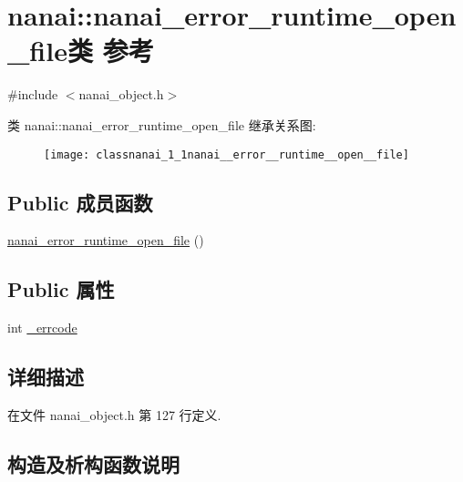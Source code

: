 \hypertarget{classnanai_1_1nanai__error__runtime__open__file}{}\section{nanai\+:\+:nanai\+\_\+error\+\_\+runtime\+\_\+open\+\_\+file类 参考}
\label{classnanai_1_1nanai__error__runtime__open__file}


{\ttfamily \#include $<$nanai\+\_\+object.\+h$>$}

类 nanai\+:\+:nanai\+\_\+error\+\_\+runtime\+\_\+open\+\_\+file 继承关系图\+:\begin{figure}[H]
\begin{center}
\leavevmode
\texttt{[image: classnanai\_1\_1nanai\_\_error\_\_runtime\_\_open\_\_file]}
\end{center}
\end{figure}
\subsection*{Public 成员函数}
\begin{DoxyCompactItemize}
\item 
\hyperlink{classnanai_1_1nanai__error__runtime__open__file_a7ecafd733718b1371cd049961c862bd2}{nanai\+\_\+error\+\_\+runtime\+\_\+open\+\_\+file} ()
\end{DoxyCompactItemize}
\subsection*{Public 属性}
\begin{DoxyCompactItemize}
\item 
int \hyperlink{classnanai_1_1nanai__error__runtime__open__file_a60f374c9a5f457328bf76a8576a61646}{\+\_\+errcode}
\end{DoxyCompactItemize}


\subsection{详细描述}


在文件 nanai\+\_\+object.\+h 第 127 行定义.



\subsection{构造及析构函数说明}
\hypertarget{classnanai_1_1nanai__error__runtime__open__file_a7ecafd733718b1371cd049961c862bd2}{}
